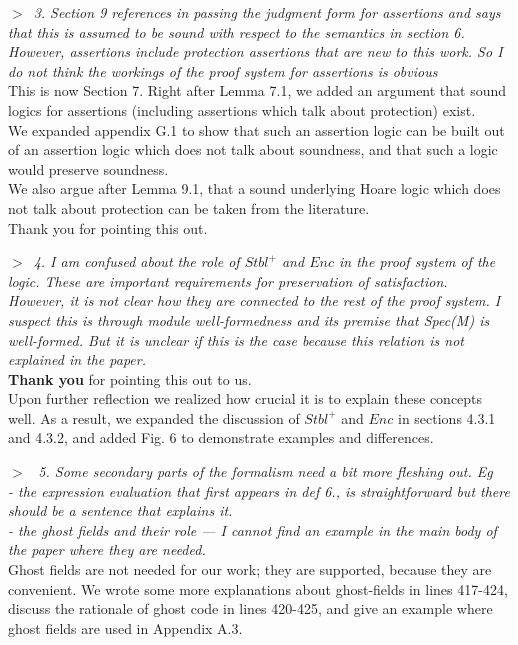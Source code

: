 \documentclass{article}
\newcommand{\pair}[2]{\noindent $>$\  \emph{#1}   \\ {#2}\\ \vspace{.1pt}}
\begin{document}
 \pair{3. Section 9 references in passing the judgment form for assertions and says that this is assumed to be sound with respect to the semantics in section 6. 
 \\
 However, assertions include protection assertions that are new to this work. So I do not think the workings of the proof system for assertions is obvious  }
{This is now Section 7. Right after Lemma 7.1, we added an argument that sound logics for assertions (including assertions which talk about protection) exist.
\\
 We expanded appendix G.1 to show that such an assertion logic can be built out of an assertion logic which does not talk about soundness, and that such a logic would preserve soundness. \\
We also argue after Lemma 9.1, that a sound underlying Hoare logic which does not talk about protection can be taken from the literature.
\\
Thank you for pointing this out.}

\pair{4. I am confused about the role of  $Stbl^+$ and $Enc$ in the proof system of the logic. These are important requirements for preservation of satisfaction. 
\\
However, it is not clear how they are connected to the rest of the proof system. I suspect this is through module well-formedness and its premise that Spec(M) is well-formed. But it is unclear if this is the case because this relation is not explained in the paper.}
{{\textbf{Thank you}} for pointing this out to us. 
\\
Upon further reflection we realized how crucial it is to explain these concepts well.
As a result, we expanded the discussion of $Stbl^+$ and $Enc$ in sections 4.3.1 and 4.3.2, and added Fig. 6 to demonstrate examples and differences.}

\pair{ 5. Some secondary parts of the formalism need a bit more fleshing out. Eg
\\ - the expression evaluation that first appears in def 6., is straightforward but there should be a sentence that explains it. 
\\	- the ghost fields and their role --- I cannot find an example in the main body of the paper where they are needed. }
{Ghost fields are not needed for our work; they are supported, because they are convenient. We wrote some more explanations about ghost-fields in lines 417-424,  discuss the rationale of ghost code in lines 420-425, and give an example where ghost fields are used in Appendix A.3.}
\end{document}
